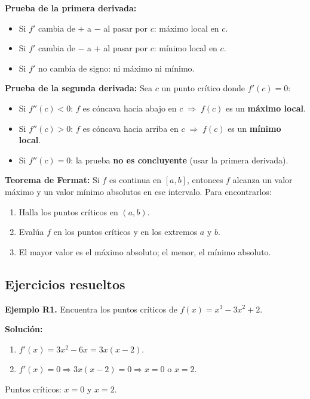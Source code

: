 \documentclass[12pt, letterpaper]{article}
\begin{document}
\begin{cuadrosolucion}
  \textbf{Prueba de la primera derivada:}
  \begin{itemize}[leftmargin=*]
    \item Si $f'$ cambia de $+$ a $-$ al pasar por $c$: máximo local en $c$.
    \item Si $f'$ cambia de $-$ a $+$ al pasar por $c$: mínimo local en $c$.
    \item Si $f'$ no cambia de signo: ni máximo ni mínimo.
  \end{itemize}
\end{cuadrosolucion}
\newpage
\begin{cuadroextra}
  \textbf{Prueba de la segunda derivada:}
  Sea $c$ un punto crítico donde $f'(c) = 0$:
  \begin{itemize}[leftmargin=*]
    \item Si $f''(c) < 0$: $f$ es cóncava hacia abajo en $c \;\Rightarrow\; f(c)$ es un \textbf{máximo local}.
    \item Si $f''(c) > 0$: $f$ es cóncava hacia arriba en $c \;\Rightarrow\; f(c)$ es un \textbf{mínimo local}.
    \item Si $f''(c) = 0$: la prueba \textbf{no es concluyente} (usar la primera derivada).
  \end{itemize}
\end{cuadroextra}

\begin{cuadroadvertencia}
  \textbf{Teorema de Fermat:} Si $f$ es continua en $[a, b]$, entonces $f$ alcanza un valor máximo y un valor mínimo absolutos en ese intervalo. Para encontrarlos:
  \begin{enumerate}
    \item Halla los puntos críticos en $(a, b)$.
    \item Evalúa $f$ en los puntos críticos y en los extremos $a$ y $b$.
    \item El mayor valor es el máximo absoluto; el menor, el mínimo absoluto.
  \end{enumerate}
\end{cuadroadvertencia}

\subsection{Ejercicios resueltos}

\textbf{Ejemplo R1.} Encuentra los puntos críticos de $f(x) = x^3 - 3x^2 + 2$.

\begin{cuadrosolucion}
  \textbf{Solución:}
  \begin{enumerate}
    \item $f'(x) = 3x^2 - 6x = 3x(x - 2)$.
    \item $f'(x) = 0 \Rightarrow 3x(x - 2) = 0 \Rightarrow x = 0$ o $x = 2$.
  \end{enumerate}
  Puntos críticos: $x = 0$ y $x = 2$.
\end{cuadrosolucion}
\end{document}
